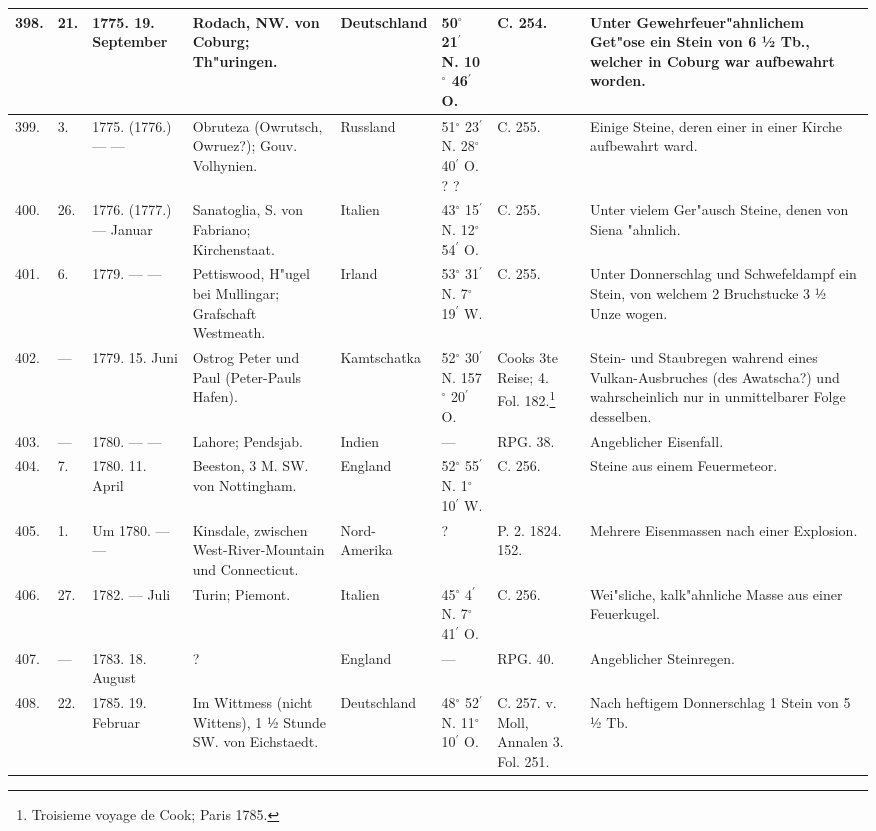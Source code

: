 \documentclass[a4paper, 8pt, oneside, polutonikogreek, german]{article}
\begin{document}
\begin{center}
\begin{longtable}{| p{5mm} | p{3mm} | p{15mm} | p{25mm} | p{20mm} | p{14mm} | p{17mm} | p{24mm} |}
        398. & 21. & 1775. 19. September & Rodach, NW. von Coburg; Th"uringen. & Deutschland & 50$^\circ$ 21$^\prime$ N. 10$^\circ$ 46$^\prime$ O. & C. 254. & Unter Gewehrfeuer"ahnlichem Get"ose ein Stein von 6 ½ Tb., welcher in Coburg war aufbewahrt worden. \\ \hline
        399. & 3. & 1775. (1776.) --- --- & Obruteza (Owrutsch, Owruez?); Gouv. Volhynien. & Russland & 51$^\circ$ 23$^\prime$ N. 28$^\circ$ 40$^\prime$ O. ? ? & C. 255. & Einige Steine, deren einer in einer Kirche aufbewahrt ward. \\ \hline
        400. & 26. & 1776. (1777.) --- Januar & Sanatoglia, S. von Fabriano; Kirchenstaat. & Italien & 43$^\circ$ 15$^\prime$ N. 12$^\circ$ 54$^\prime$ O. & C. 255. & Unter vielem Ger"ausch Steine, denen von Siena "ahnlich. \\ \hline
        401. & 6. & 1779. --- --- & Pettiswood, H"ugel bei Mullingar; Grafschaft Westmeath. & Irland & 53$^\circ$ 31$^\prime$ N. 7$^\circ$ 19$^\prime$ W. & C. 255. & Unter Donnerschlag und Schwefeldampf ein Stein, von welchem 2 Bruchstucke 3 ½ Unze wogen. \\ \hline
        402. & --- & 1779. 15. Juni & Ostrog Peter und Paul (Peter-Pauls Hafen). & Kamtschatka & 52$^\circ$ 30$^\prime$ N. 157$^\circ$ 20$^\prime$ O. & Cooks 3te Reise; 4. Fol. 182.\footnote{Troisieme voyage de Cook; Paris 1785.} & Stein- und Staubregen wahrend eines Vulkan-Ausbruches (des Awatscha?) und wahrscheinlich nur in unmittelbarer Folge desselben. \\ \hline
        403. & --- & 1780. --- --- & Lahore; Pendsjab. & Indien & --- & RPG. 38. & Angeblicher Eisenfall. \\ \hline
        404. & 7. & 1780. 11. April & Beeston, 3 M. SW. von Nottingham. & England & 52$^\circ$ 55$^\prime$ N. 1$^\circ$ 10$^\prime$ W. & C. 256. & Steine aus einem Feuermeteor. \\ \hline
        405. & 1. & Um 1780. --- --- & Kinsdale, zwischen West-River-Mountain und Connecticut. & Nord-Amerika & ? & P. 2. 1824. 152. & Mehrere Eisenmassen nach einer Explosion. \\ \hline
        406. & 27. & 1782. --- Juli & Turin; Piemont. & Italien & 45$^\circ$ 4$^\prime$ N. 7$^\circ$ 41$^\prime$ O. & C. 256. & Wei"sliche, kalk"ahnliche Masse aus einer Feuerkugel. \\ \hline
        407. & --- & 1783. 18. August & ? & England & --- & RPG. 40. & Angeblicher Steinregen. \\ \hline
        408. & 22. & 1785. 19. Februar & Im Wittmess (nicht Wittens), 1 ½ Stunde SW. von Eichstaedt. & Deutschland & 48$^\circ$ 52$^\prime$ N. 11$^\circ$ 10$^\prime$ O. & C. 257. v. Moll, Annalen 3. Fol. 251. & Nach heftigem Donnerschlag 1 Stein von 5 ½ Tb. \\ \hline

\end{longtable}
\end{center}
\end{document}
